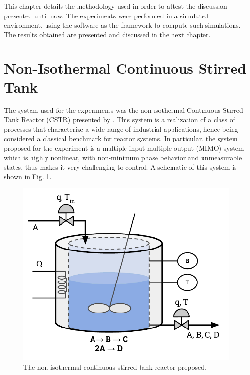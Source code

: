 \documentclass[a4paper,11pt]{book}
\numberwithin{figure}{chapter}
\numberwithin{equation}{chapter}
\numberwithin{table}{chapter}
\theoremstyle{definition}
\begin{document}
This chapter details the methodology used in order to attest the discussion presented until now. The experiments were performed in a simulated environment, using the \cite{MATLAB:2018} software as the framework to compute such simulations. The results obtained are presented and discussed in the next chapter.   

\section{Non-Isothermal Continuous Stirred Tank}

The system used for the experiments was the non-isothermal Continuous Stirred Tank Reactor (CSTR) presented by \cite{Klatt:1998}. This system is a realization of a class of processes that characterize a wide range of industrial applications, hence being considered a classical benchmark for reactor systems. In particular, the system proposed for the experiment is a multiple-input multiple-output (MIMO) system which is highly nonlinear, with non-minimum phase behavior and unmeasurable states, thus makes it very challenging to control. A schematic of this system is shown in Fig. \ref{fig:methodology01}. 

\begin{figure}[ht] \centering
	\includegraphics[scale=0.75]{chapter6/exoCSTR}
	\caption{The non-isothermal continuous stirred tank reactor proposed.}
	\label{fig:methodology01}
\end{figure}
\end{document}
